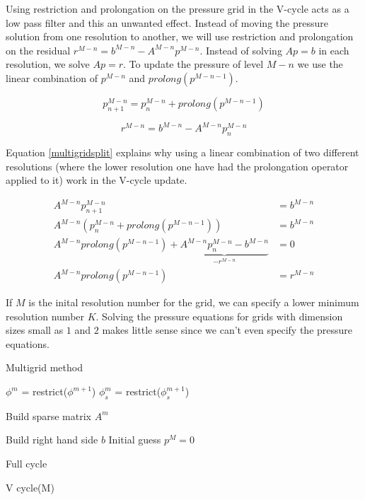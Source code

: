 Using restriction and prolongation on the pressure grid in the V-cycle acts as a low pass filter and this an unwanted effect. Instead of moving the pressure solution from one resolution to another, we will use restriction and prolongation on the residual $r^{M-n} = b^{M-n} - A^{M-n}p^{M-n}$. Instead of solving $Ap = b$ in each resolution, we solve $Ap = r$. To update the pressure of level $M-n$ we use the linear combination of $p^{M-n}$ and $prolong(p^{M-n-1})$.

\begin{equation}
p^{M-n}_{n+1} = p^{M-n}_n + prolong(p^{M-n-1})
\end{equation}

\begin{equation}
r^{M-n} = b^{M-n} - A^{M-n} p^{M-n}_n 
\end{equation}

Equation \ref{multigridsplit} explains why using a linear combination of two different resolutions (where the lower resolution one have had the prolongation operator applied to it) work in the V-cycle update.

\begin{equation}
\begin{split}
A^{M-n} p^{M-n}_{n+1} &= b^{M-n} \\
A^{M-n} (p^{M-n}_n + prolong(p^{M-n-1})) &= b^{M-n} \\
A^{M-n} prolong(p^{M-n-1}) +  \underbrace{ A^{M-n} p^{M-n}_n -  b^{M-n} }_\text{$-r^{M-n}$} &= 0 \\
A^{M-n} prolong(p^{M-n-1})  &= r^{M-n}
\end{split}
\label{multigridsplit}
\end{equation}

If $M$ is the inital resolution number for the grid, we can specify a lower minimum resolution number $K$. Solving the pressure equations for grids with dimension sizes small as $1$ and $2$ makes little sense since we can't even specify the pressure equations. 

\begin{algorithm}
\caption{Multigrid method}
\begin{algorithmic}[1]
\STATE $\phi^m$ = restrict($\phi^{m+1}$)
\STATE $\phi^m_s$ = restrict($\phi^{m+1}_s$)
\ENDFOR

\STATE Build sparse matrix $A^m$
\ENDFOR

\STATE Build right hand side $b$
\STATE Initial guess $p^M = 0$

\STATE Full cycle
\ENDFOR

\STATE V cycle(M)
\ENDFOR

\end{algorithmic}
\label{multigridalgorithm}
\end{algorithm}


